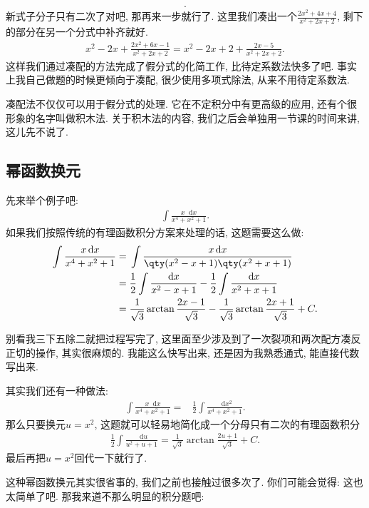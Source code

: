 \documentclass{ctexbook}
\newcommand*{\dif}{\mathop{}\!\mathrm{d}}
\begin{document}
{\begin{align*}
.\end{align*}
新式子分子只有二次了对吧, 那再来一步就行了. 这里我们凑出一个$\frac{2x^{2}+4x+4}{x^{2}+2x+2}$, 剩下的部分在另一个分式中补齐就好. 
\begin{align*}
x^{2}-2x+\frac{2x^{2}+6x-1}{x^{2}+2x+2}=x^{2}-2x+2+\frac{2x-5}{x^{2}+2x+2}
.\end{align*}
这样我们通过凑配的方法完成了假分式的化简工作, 比待定系数法快多了吧. 事实上我自己做题的时候更倾向于凑配, 很少使用多项式除法, 从来不用待定系数法. \par
凑配法不仅仅可以用于假分式的处理. 它在不定积分中有更高级的应用, 还有个很形象的名字叫做积木法. 关于积木法的内容, 我们之后会单独用一节课的时间来讲, 这儿先不说了. \par
\subsection{幂函数换元}
先来举个例子吧: 
\begin{align*}
\int\frac{x\dif{x}}{x^{4}+x^{2}+1}
.\end{align*}
如果我们按照传统的有理函数积分方案来处理的话, 这题需要这么做: 
\begin{align*}
\int\frac{x\dif{x}}{x^{4}+x^{2}+1}={}&\int\frac{x\dif{x}}{\qty(x^{2}-x+1)\qty(x^{2}+x+1)}\\
={}&\frac{1}{2}\int\frac{\dif{x}}{x^{2}-x+1}-\frac{1}{2}\int\frac{\dif{x}}{x^{2}+x+1}\\
={}&\frac{1}{\sqrt{3}}\arctan{\frac{2x-1}{\sqrt{3}}}-\frac{1}{\sqrt{3}}\arctan{\frac{2x+1}{\sqrt{3}}}+C
.\end{align*}\par
别看我三下五除二就把过程写完了, 这里面至少涉及到了一次裂项和两次配方凑反正切的操作, 其实很麻烦的. 我能这么快写出来, 还是因为我熟悉通式, 能直接代数写出来. \par
其实我们还有一种做法: 
\begin{align*}
\int\frac{x\dif{x}}{x^{4}+x^{2}+1}={}&\frac{1}{2}\int\frac{\dif{x^{2}}}{x^{4}+x^{2}+1}
.\end{align*}
那么只要换元$u=x^{2}$, 这题就可以轻易地简化成一个分母只有二次的有理函数积分
\begin{align*}
\frac{1}{2}\int\frac{\dif{u}}{u^{2}+u+1}=\frac{1}{\sqrt{3}}\arctan{\frac{2u+1}{\sqrt{3}}}+C
.\end{align*}
最后再把$u=x^{2}$回代一下就行了. \par
这种幂函数换元其实很省事的, 我们之前也接触过很多次了. 你们可能会觉得: 这也太简单了吧. 那我来道不那么明显的积分题吧: 
\begin{align*}

\end{align*}}
\end{document}
